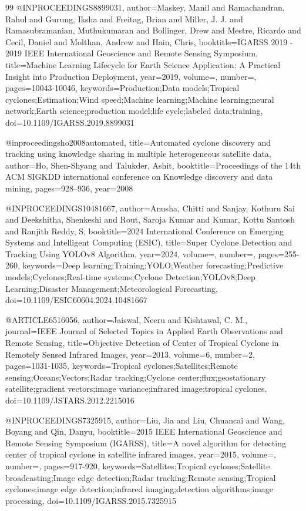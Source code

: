 \begin{thebibliography}{99}
@INPROCEEDINGS{8899031,
  author={Maskey, Manil and Ramachandran, Rahul and Gurung, Iksha and Freitag, Brian and Miller, J. J. and Ramasubramanian, Muthukumaran and Bollinger, Drew and Mestre, Ricardo and Cecil, Daniel and Molthan, Andrew and Hain, Chris},
  booktitle={IGARSS 2019 - 2019 IEEE International Geoscience and Remote Sensing Symposium}, 
  title={Machine Learning Lifecycle for Earth Science Application: A Practical Insight into Production Deployment}, 
  year={2019},
  volume={},
  number={},
  pages={10043-10046},
  keywords={Production;Data models;Tropical cyclones;Estimation;Wind speed;Machine learning;Machine learning;neural network;Earth science;production model;life cycle;labeled data;training},
  doi={10.1109/IGARSS.2019.8899031}}


@inproceedings{ho2008automated,
  title={Automated cyclone discovery and tracking using knowledge sharing in multiple heterogeneous satellite data},
  author={Ho, Shen-Shyang and Talukder, Ashit},
  booktitle={Proceedings of the 14th ACM SIGKDD international conference on Knowledge discovery and data mining},
  pages={928--936},
  year={2008}
}

@INPROCEEDINGS{10481667,
  author={Anusha, Chitti and Sanjay, Kothuru Sai and Deekshitha, Shenkeshi and Rout, Saroja Kumar and Kumar, Kottu Santosh and Ranjith Reddy, S},
  booktitle={2024 International Conference on Emerging Systems and Intelligent Computing (ESIC)}, 
  title={Super Cyclone Detection and Tracking Using YOLOv8 Algorithm}, 
  year={2024},
  volume={},
  number={},
  pages={255-260},
  keywords={Deep learning;Training;YOLO;Weather forecasting;Predictive models;Cyclones;Real-time systems;Cyclone Detection;YOLOv8;Deep Learning;Disaster Management;Meteorological Forecasting},
  doi={10.1109/ESIC60604.2024.10481667}}

@ARTICLE{6516056,
  author={Jaiswal, Neeru and Kishtawal, C. M.},
  journal={IEEE Journal of Selected Topics in Applied Earth Observations and Remote Sensing}, 
  title={Objective Detection of Center of Tropical Cyclone in Remotely Sensed Infrared Images}, 
  year={2013},
  volume={6},
  number={2},
  pages={1031-1035},
  keywords={Tropical cyclones;Satellites;Remote sensing;Oceans;Vectors;Radar tracking;Cyclone center;flux;geostationary satellite;gradient vectors;image variance;infrared image;tropical cyclones},
  doi={10.1109/JSTARS.2012.2215016}}


@INPROCEEDINGS{7325915,
  author={Liu, Jia and Liu, Chuancai and Wang, Boyang and Qin, Danyu},
  booktitle={2015 IEEE International Geoscience and Remote Sensing Symposium (IGARSS)}, 
  title={A novel algorithm for detecting center of tropical cyclone in satellite infrared images}, 
  year={2015},
  volume={},
  number={},
  pages={917-920},
  keywords={Satellites;Tropical cyclones;Satellite broadcasting;Image edge detection;Radar tracking;Remote sensing;Tropical cyclones;image edge detection;infrared imaging;detection algorithms;image processing},
  doi={10.1109/IGARSS.2015.7325915}}



\end{thebibliography}
